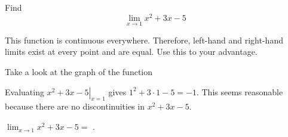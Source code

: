 \documentclass{ximera}
\begin{document}
\begin{question}
  Find 
  \[
  \displaystyle \lim_{x\to 1} x^2+3x-5
  \]
  \begin{solution}
    \begin{hint}
      This function is continuous everywhere. Therefore, left-hand and right-hand limits exist at every point and are equal. Use this to your advantage.
    \end{hint}
     \begin{hint}
    Take a look at the graph of the function
    \begin{center}
      \end{center}
    \end{hint}
    \begin{hint}
     Evaluating $\left.x^2+3x-5\right|_{x=1}$ gives $1^2+3\cdot1-5=-1$. This seems reasonable because there are no discontinuities in $x^2+3x-5$.
    \end{hint}
    $\displaystyle{\lim_{x\to1}x^2+3x-5}=$
    .
  \end{solution}
\end{question}
\end{document}
